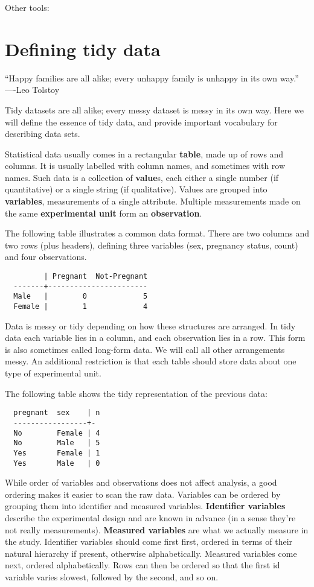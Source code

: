 \documentclass[oneside]{article}
\begin{document}
Other tools: \citep{kandel:2011}

\section{Defining tidy data}

``Happy families are all alike; every unhappy family is unhappy in its own way.'' ----Leo Tolstoy

Tidy datasets are all alike; every messy dataset is messy in its own way. Here we will define the essence of tidy data, and provide important vocabulary for describing data sets.

Statistical data usually comes in a rectangular \textbf{table}, made up of rows and columns. It is usually labelled with column names, and sometimes with row names. Such data is a collection of \textbf{value}s, each either a single number (if quantitative) or a single string (if qualitative). Values are grouped into \textbf{variables}, measurements of a single attribute. Multiple measurements made on the same \textbf{experimental unit} form an \textbf{observation}. 

The following table illustrates a common data format. There are two columns and two rows (plus headers), defining three variables (sex, pregnancy status, count) and four observations.

\begin{verbatim}
         | Pregnant  Not-Pregnant
  -------+-----------------------
  Male   |        0             5
  Female |        1             4
\end{verbatim}

Data is messy or tidy depending on how these structures are arranged. In tidy data each variable lies in a column, and each observation lies in a row. This form is also sometimes called long-form data. We will call all other arrangements messy.  An additional restriction is that each table should store data about one type of experimental unit.

The following table shows the tidy representation of the previous data:

\begin{verbatim}
  pregnant  sex    | n
  -----------------+-
  No        Female | 4
  No        Male   | 5
  Yes       Female | 1
  Yes       Male   | 0
\end{verbatim}

While order of variables and observations does not affect analysis, a good ordering makes it easier to scan the raw data. Variables can be ordered by grouping them into identifier and measured variables. \textbf{Identifier variables} describe the experimental design and are known in advance (in a sense they're not really measurements). \textbf{Measured variables} are what we actually measure in the study. Identifier variables should come first first, ordered in terms of their natural hierarchy if present, otherwise alphabetically. Measured variables come next, ordered alphabetically. Rows can then be ordered so that the first id variable varies slowest, followed by the second, and so on.
\end{document}
